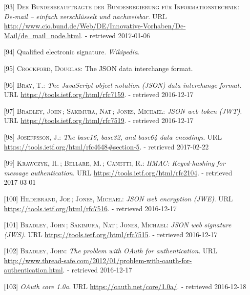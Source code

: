 \documentclass[12pt,english,a4paper,titlepage,cleardoublepage=empty,dottedtoc]{report}
\begin{document}
\hypertarget{ref-web_2017_about-de-mail}{}
{[}93{]} \textsc{Der Bundesbeauftragte der Bundesregierung für
Informationstechnik}: \emph{De-mail -- einfach verschlüsselt und
nachweisbar}. URL
\url{http://www.cio.bund.de/Web/DE/Innovative-Vorhaben/De-Mail/de_mail_node.html}.
- retrieved 2017-01-06

\hypertarget{ref-web_2017_wikipedia_qes}{}
{[}94{]} Qualified electronic signature. \emph{Wikipedia}.

\hypertarget{ref-web_spec_json}{}
{[}95{]} \textsc{Crockford, Douglas}: The JSON data interchange format.

\hypertarget{ref-web_rfc_json}{}
{[}96{]} \textsc{Bray, T.}: \emph{The JavaScript object notation (JSON)
data interchange format}. URL \url{https://tools.ietf.org/html/rfc7159}.
- retrieved 2016-12-17

\hypertarget{ref-web_spec_json-web-token}{}
{[}97{]} \textsc{Bradley, John}\,; \textsc{Sakimura, Nat}\,;
\textsc{Jones, Michael}: \emph{JSON web token (JWT)}. URL
\url{https://tools.ietf.org/html/rfc7519}. - retrieved 2016-12-17

\hypertarget{ref-web_spec_base64url}{}
{[}98{]} \textsc{Joseffsson, J.}: \emph{The base16, base32, and base64
data encodings}. URL
\url{https://tools.ietf.org/html/rfc4648\#section-5}. - retrieved
2017-02-22

\hypertarget{ref-web_spec_hmac}{}
{[}99{]} \textsc{Krawczyk, H.}\,; \textsc{Bellare, M.}\,;
\textsc{Canetti, R.}: \emph{HMAC: Keyed-hashing for message
authentication}. URL \url{https://tools.ietf.org/html/rfc2104}. -
retrieved 2017-03-01

\hypertarget{ref-web_spec_json-web-encryption}{}
{[}100{]} \textsc{Hildebrand, Joe}\,; \textsc{Jones, Michael}:
\emph{JSON web encryption (JWE)}. URL
\url{https://tools.ietf.org/html/rfc7516}. - retrieved 2016-12-17

\hypertarget{ref-web_spec_json-web-signature}{}
{[}101{]} \textsc{Bradley, John}\,; \textsc{Sakimura, Nat}\,;
\textsc{Jones, Michael}: \emph{JSON web signature (JWS)}. URL
\url{https://tools.ietf.org/html/rfc7515}. - retrieved 2016-12-17

\hypertarget{ref-web_2012_problem-with-oauth-for-authentication}{}
{[}102{]} \textsc{Bradley, John}: \emph{The problem with OAuth for
authentication.} URL
\url{http://www.thread-safe.com/2012/01/problem-with-oauth-for-authentication.html}.
- retrieved 2016-12-17

\hypertarget{ref-web_spec_oauth-1a}{}
{[}103{]} \emph{OAuth core 1.0a}. URL
\url{https://oauth.net/core/1.0a/}. - retrieved 2016-12-18
\end{document}
